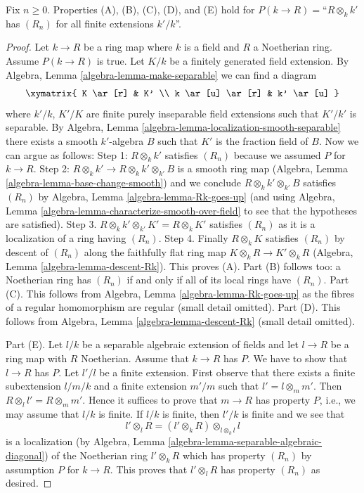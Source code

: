 \begin{lemma}
\label{lemma-formal-fibres-Rk}
Fix $n \geq 0$. Properties (A), (B), (C), (D), and (E) hold for
$P(k \to R) =$``$R \otimes_k k'$ has $(R_n)$ for all finite
extensions $k'/k$''.
\end{lemma}

\begin{proof}
Let $k \to R$ be a ring map where $k$ is a field and $R$ a Noetherian
ring. Assume $P(k \to R)$ is true.
Let $K/k$ be a finitely generated field extension.
By Algebra, Lemma \ref{algebra-lemma-make-separable} we can find a diagram
$$
\xymatrix{
K \ar[r] & K' \\
k \ar[u] \ar[r] & k' \ar[u]
}
$$
where $k'/k$, $K'/K$ are finite purely inseparable field
extensions such that $K'/k'$ is separable. By
Algebra, Lemma \ref{algebra-lemma-localization-smooth-separable}
there exists a smooth $k'$-algebra $B$ such that $K'$ is the
fraction field of $B$. Now we can argue as follows:
Step 1: $R \otimes_k k'$ satisfies $(R_n)$ because we assumed $P$
for $k \to R$.
Step 2: $R \otimes_k k' \to R \otimes_k k' \otimes_{k'} B$ is a
smooth ring map (Algebra, Lemma \ref{algebra-lemma-base-change-smooth})
and we conclude $R \otimes_k k' \otimes_{k'} B$ satisfies $(R_n)$
by Algebra, Lemma \ref{algebra-lemma-Rk-goes-up}
(and using Algebra, Lemma \ref{algebra-lemma-characterize-smooth-over-field}
to see that the hypotheses are satisfied).
Step 3. $R \otimes_k k' \otimes_{k'} K' = R \otimes_k K'$ satisfies
$(R_n)$ as it is a localization of a ring having $(R_n)$.
Step 4. Finally $R \otimes_k K$ satisfies $(R_n)$ by descent of
$(R_n)$ along the faithfully flat ring map
$K \otimes_k R \to K' \otimes_k R$
(Algebra, Lemma \ref{algebra-lemma-descent-Rk}).
This proves (A).
Part (B) follows too: a Noetherian ring has $(R_n)$ if and only if
all of its local rings have $(R_n)$.
Part (C). This follows from Algebra, Lemma \ref{algebra-lemma-Rk-goes-up}
as the fibres of a regular homomorphism are regular (small detail omitted).
Part (D). This follows from Algebra, Lemma \ref{algebra-lemma-descent-Rk}
(small detail omitted).

\medskip\noindent
Part (E). Let $l/k$ be a separable algebraic extension of fields and
let $l \to R$ be a ring map with $R$ Noetherian. Assume that
$k \to R$ has $P$. We have to show that $l \to R$ has $P$.
Let $l'/l$ be a finite extension. First observe that there exists a
finite subextension $l/m/k$ and a finite extension $m'/m$
such that $l' = l \otimes_m m'$. Then $R \otimes_l l' = R \otimes_m m'$.
Hence it suffices to prove that $m \to R$ has property $P$, i.e.,
we may assume that $l/k$ is finite. If $l/k$ is finite, then $l'/k$
is finite and we see that
$$
l' \otimes_l R = (l' \otimes_k R) \otimes_{l \otimes_k l} l
$$
is a localization
(by Algebra, Lemma \ref{algebra-lemma-separable-algebraic-diagonal})
of the Noetherian ring $l' \otimes_k R$ which has property $(R_n)$
by assumption $P$ for $k \to R$. This proves that $l' \otimes_l R$
has property $(R_n)$ as desired.
\end{proof}








